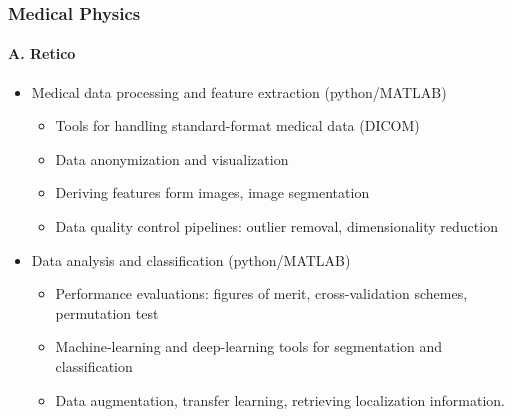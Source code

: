\documentclass[9pt]{beamer}
\begin{document}
\begin{frame}
  \frametitle{Medical Physics}
  \framesubtitle{A. Retico}
  \begin{itemize}
  \item Medical data processing and feature extraction (python/MATLAB)%
    \begin{itemize}
    \item Tools for handling standard-format medical data (DICOM)
    \item Data anonymization and visualization
    \item Deriving features form images, image segmentation
    \item Data quality control pipelines: outlier removal, dimensionality
      reduction
    \end{itemize}
  \item Data analysis and classification (python/MATLAB)
    \begin{itemize}
    \item Performance evaluations: figures of merit, cross-validation schemes,
      permutation test
    \item Machine-learning and deep-learning tools for segmentation and
      classification
    \item Data augmentation, transfer learning, retrieving localization
      information.
    \end{itemize}
  \end{itemize}
\end{frame}
\end{document}

